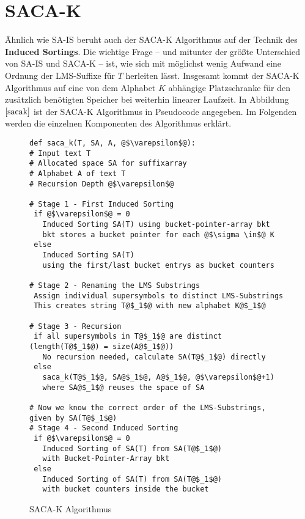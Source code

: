 \section{SACA-K}
\label{section:saca_k}

\newcommand {\suf} {\text{suf}}
\newcommand {\level} {\varepsilon}
\newcommand {\symbWidth} {0.3cm}

Ähnlich  wie SA-IS beruht auch der SACA-K Algorithmus auf der Technik des \textbf{Induced Sortings}. Die wichtige Frage -- und mitunter der größte Unterschied von SA-IS und SACA-K -- ist, wie sich mit möglichst wenig Aufwand eine Ordnung der LMS-Suffixe für $T$ herleiten lässt. Insgesamt kommt der SACA-K Algorithmus auf eine von dem Alphabet $K$ abhängige Platzschranke für den zusätzlich benötigten Speicher bei weiterhin linearer Laufzeit. In Abbildung $\ref{sacak}$ ist der SACA-K Algorithmus in Pseudocode angegeben. Im Folgenden werden die einzelnen Komponenten des Algorithmus erklärt. \\

\begin{figure}
\begin{verbatim}
def saca_k(T, SA, A, @$\varepsilon$@):
# Input text T
# Allocated space SA for suffixarray
# Alphabet A of text T
# Recursion Depth @$\varepsilon$@

# Stage 1 - First Induced Sorting
 if @$\varepsilon$@ = 0
   Induced Sorting SA(T) using bucket-pointer-array bkt 
   bkt stores a bucket pointer for each @$\sigma \in$@ K
 else
   Induced Sorting SA(T) 
   using the first/last bucket entrys as bucket counters
		
# Stage 2 - Renaming the LMS Substrings
 Assign individual supersymbols to distinct LMS-Substrings
 This creates string T@$_1$@ with new alphabet K@$_1$@
	
# Stage 3 - Recursion
 if all supersymbols in T@$_1$@ are distinct (length(T@$_1$@) = size(A@$_1$@))
   No recursion needed, calculate SA(T@$_1$@) directly
 else
   saca_k(T@$_1$@, SA@$_1$@, A@$_1$@, @$\varepsilon$@+1)
   where SA@$_1$@ reuses the space of SA

# Now we know the correct order of the LMS-Substrings, given by SA(T@$_1$@)
# Stage 4 - Second Induced Sorting
 if @$\varepsilon$@ = 0
   Induced Sorting of SA(T) from SA(T@$_1$@) 
   with Bucket-Pointer-Array bkt
 else
   Induced Sorting of SA(T) from SA(T@$_1$@) 
   with bucket counters inside the bucket

\end{verbatim}
\caption{SACA-K Algorithmus}
\label{sacak}
\end{figure}

